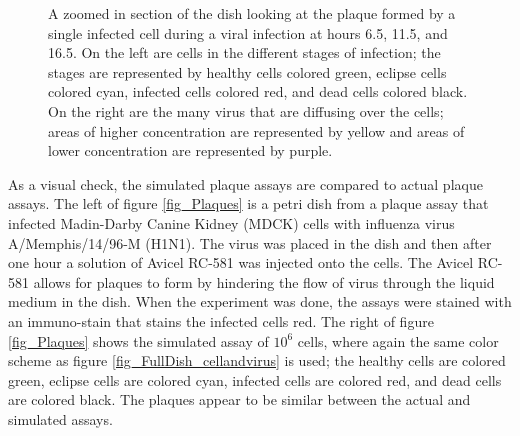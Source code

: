 \begin{figure}
\begin{minipage}{0.66\linewidth}
    \vspace{0.25em}
\end{minipage}
\caption{A zoomed in section of the dish looking at the plaque formed by a single infected cell during a viral infection at hours 6.5, 11.5, and 16.5. On the left are cells in the different stages of infection; the stages are represented by healthy cells colored green, eclipse cells colored cyan, infected cells colored red, and dead cells colored black. On the right are the many virus that are diffusing over the cells; areas of higher concentration are represented by yellow and areas of lower concentration are represented by purple. \label{fig_ZoominDish}}
\end{figure}

As a visual check, the simulated plaque assays are compared to actual plaque assays. The left of figure \ref{fig_Plaques} is a petri dish from a plaque assay that infected Madin-Darby Canine Kidney (MDCK) cells with influenza virus A/Memphis/14/96-M (H1N1). The virus was placed in the dish and then after one hour a solution of Avicel RC-581 was injected onto the cells. The Avicel RC-581 allows for plaques to form by hindering the flow of virus through the liquid medium in the dish. When the experiment was done, the assays were stained with an immuno-stain that stains the infected cells red. The right of figure \ref{fig_Plaques} shows the simulated assay of $10^{6}$ cells, where again the same color scheme as figure \ref{fig_FullDish_cellandvirus} is used; the healthy cells are colored green, eclipse cells are colored cyan, infected cells are colored red, and dead cells are colored black. The plaques appear to be similar between the actual and simulated assays.

